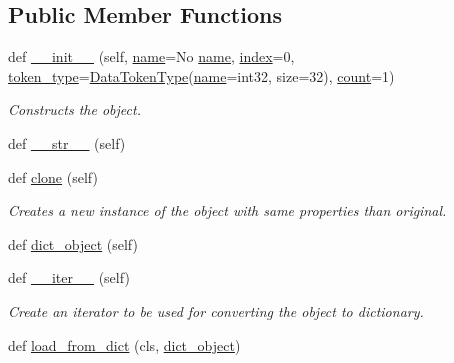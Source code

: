\subsection*{Public Member Functions}
\begin{DoxyCompactItemize}
\item 
def \hyperlink{classsylva_1_1base_1_1sdf_1_1_port_a1c863910b4100f268b9193513b5d0963}{\+\_\+\+\_\+init\+\_\+\+\_\+} (self, \hyperlink{classsylva_1_1base_1_1sdf_1_1_port_aa8aa0ac5a7e375e2c0cb6e92a0b1dd20}{name}=\textquotesingle{}No \hyperlink{classsylva_1_1base_1_1sdf_1_1_port_aa8aa0ac5a7e375e2c0cb6e92a0b1dd20}{name}\textquotesingle{}, \hyperlink{classsylva_1_1base_1_1sdf_1_1_port_abbfd66f762649b6a8105657259471c5a}{index}=0, \hyperlink{classsylva_1_1base_1_1sdf_1_1_port_a3bc0e05af490f897794a9781127c69e3}{token\+\_\+type}=\hyperlink{classsylva_1_1base_1_1sdf_1_1_data_token_type}{Data\+Token\+Type}(\hyperlink{classsylva_1_1base_1_1sdf_1_1_port_aa8aa0ac5a7e375e2c0cb6e92a0b1dd20}{name}=\textquotesingle{}int32\textquotesingle{}, size=32), \hyperlink{classsylva_1_1base_1_1sdf_1_1_port_aec009757acfd92df95b273c671cac068}{count}=1)
\begin{DoxyCompactList}\small\item\em Constructs the object. \end{DoxyCompactList}\item 
def \hyperlink{classsylva_1_1base_1_1sdf_1_1_port_a8e6cd7c07850ca053a8a8788d94ae37c}{\+\_\+\+\_\+str\+\_\+\+\_\+} (self)
\item 
def \hyperlink{classsylva_1_1base_1_1sdf_1_1_port_ad0192710d76f8b2b3fefeef6e49f49bd}{clone} (self)
\begin{DoxyCompactList}\small\item\em Creates a new instance of the object with same properties than original. \end{DoxyCompactList}\item 
def \hyperlink{classsylva_1_1base_1_1sdf_1_1_port_a15a6d8d321b101e2247cad4cd14d5623}{dict\+\_\+object} (self)
\item 
def \hyperlink{classsylva_1_1base_1_1sylva__base_1_1_s_y_l_v_a_base_a8dc04df3b843a1deb6e1ae13f8425783}{\+\_\+\+\_\+iter\+\_\+\+\_\+} (self)
\begin{DoxyCompactList}\small\item\em Create an iterator to be used for converting the object to dictionary. \end{DoxyCompactList}\item 
def \hyperlink{classsylva_1_1base_1_1sylva__base_1_1_s_y_l_v_a_base_a4acd68307f4b2bef6082b86f3ff6ce3a}{load\+\_\+from\+\_\+dict} (cls, \hyperlink{classsylva_1_1base_1_1sdf_1_1_port_a15a6d8d321b101e2247cad4cd14d5623}{dict\+\_\+object})

\end{DoxyCompactItemize}
